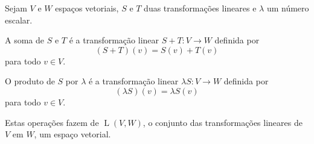 \begin{definition}
	Sejam $V$ e $W$ espaços vetoriais, $S$ e $T$ duas transformações lineares e $\lambda$ um número escalar.
	
	A soma de $S$ e $T$ é a transformação linear $S+T\colon V\to W$ definida por
	\[
		(S+T)(v)=S(v)+T(v)\]
	para todo $v\in V$.

	O produto de $S$ por $\lambda$ é a transformação linear $\lambda S\colon V\to W$ definida por
	\[(\lambda S)(v)=\lambda S(v)\]
	para todo $v\in V$.
	
	Estas operações fazem de $\operatorname{L}(V,W)$, o conjunto das transformações lineares de $V$ em $W$, um espaço vetorial.
\end{definition}